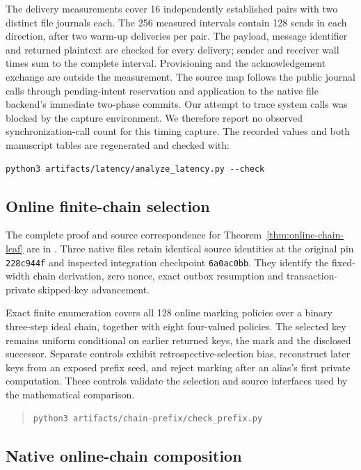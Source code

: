 \documentclass[pdflatex]{sn-jnl}
\theoremstyle{thmstyleone}
\theoremstyle{thmstylethree}
\theoremstyle{thmstyletwo}
\begin{document}
The delivery measurements cover 16 independently established pairs with two
distinct file journals each. The 256 measured intervals contain 128 sends
in each direction, after two warm-up deliveries per pair. The payload,
message identifier and returned plaintext are checked for every delivery;
sender and receiver wall times sum to the complete interval. Provisioning
and the acknowledgement exchange are outside the measurement. The source
map follows the public journal calls through pending-intent reservation
and application to the native file backend's immediate two-phase commits.
Our attempt to trace system calls was blocked by the capture environment.
We therefore report no observed synchronization-call count for this timing
capture.
The recorded values and both manuscript tables are regenerated and checked
with:
\begin{verbatim}
python3 artifacts/latency/analyze_latency.py --check
\end{verbatim}

\subsection{Online finite-chain selection}
\label{app:chain-prefix}

The complete proof and source correspondence for
Theorem~\ref{thm:online-chain-leaf} are in
. Three native files retain identical
source identities at the original pin \texttt{228c944f} and inspected
integration checkpoint \texttt{6a0ac0bb}. They identify the fixed-width
chain derivation, zero nonce, exact outbox resumption and
transaction-private skipped-key advancement.

Exact finite enumeration covers all 128 online marking policies over
a binary three-step ideal chain, together with eight four-valued
policies. The selected key remains uniform conditional on earlier
returned keys, the mark and the disclosed successor. Separate controls
exhibit retrospective-selection bias, reconstruct later keys from an
exposed prefix seed, and reject marking after an alias's first private
computation. These controls validate the selection and source
interfaces used by the mathematical comparison.
\begin{quote}
\small
\begin{verbatim}
python3 artifacts/chain-prefix/check_prefix.py
\end{verbatim}
\end{quote}

\subsection{Native online-chain composition}
\label{app:native-online-chain}
\end{document}
